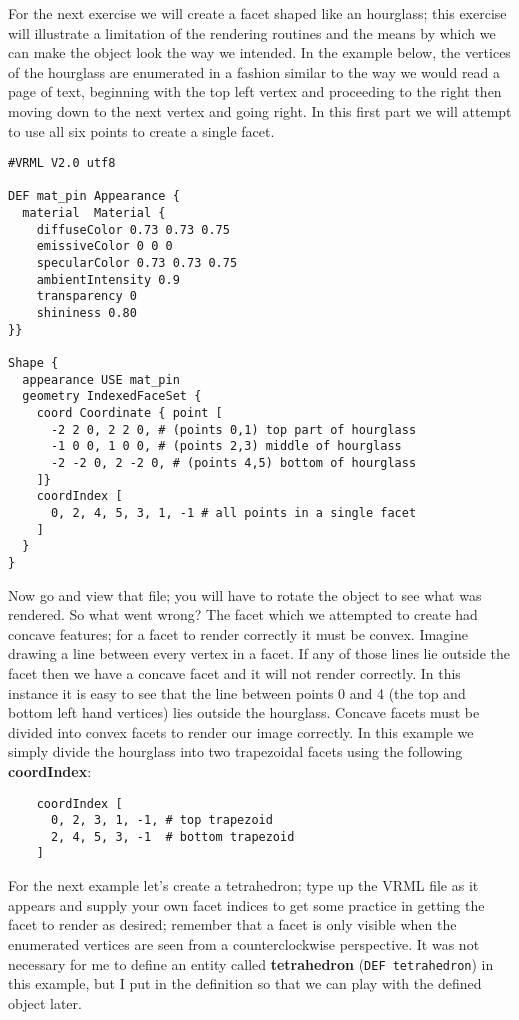 \documentclass[a4paper]{article}
\begin{document}
For the next exercise we will create a facet shaped like an hourglass; this exercise will illustrate a limitation of the rendering
routines and the means by which we can make the object look the way we intended. In the example below, the vertices of the hourglass
are enumerated in a fashion similar to the way we would read a page of text, beginning with the top left vertex and proceeding to the
right then moving down to the next vertex and going right. In this first part we will attempt to use all six points to create a single
facet.

\begin{verbatim}
#VRML V2.0 utf8

DEF mat_pin Appearance {
  material  Material {
    diffuseColor 0.73 0.73 0.75
    emissiveColor 0 0 0
    specularColor 0.73 0.73 0.75
    ambientIntensity 0.9
    transparency 0
    shininess 0.80
}}

Shape {
  appearance USE mat_pin
  geometry IndexedFaceSet {
    coord Coordinate { point [
      -2 2 0, 2 2 0, # (points 0,1) top part of hourglass
      -1 0 0, 1 0 0, # (points 2,3) middle of hourglass
      -2 -2 0, 2 -2 0, # (points 4,5) bottom of hourglass
    ]}
    coordIndex [
      0, 2, 4, 5, 3, 1, -1 # all points in a single facet
    ]
  }
}
\end{verbatim}

Now go and view that file; you will have to rotate the object to see what was rendered.  So what went wrong?
The facet which we attempted to create had concave features; for a facet to render correctly it must be convex.
Imagine drawing a line between every vertex in a facet. If any of those lines lie outside the facet then we
have a concave facet and it will not render correctly. In this instance it is easy to see that the line between
points 0 and 4 (the top and bottom left hand vertices) lies outside the hourglass. Concave facets must be
divided into convex facets to render our image correctly. In this example we simply divide the hourglass into
two trapezoidal facets using the following \textbf{coordIndex}:

\begin{verbatim}
    coordIndex [
      0, 2, 3, 1, -1, # top trapezoid
      2, 4, 5, 3, -1  # bottom trapezoid
    ]
\end{verbatim}

For the next example let's create a tetrahedron; type up the VRML file as it appears and supply your own facet
indices to get some practice in getting the facet to render as desired; remember that a facet is only visible
when the enumerated vertices are seen from a counterclockwise perspective. It was not necessary for me to
define an entity called \textbf{tetrahedron} (\verb~DEF tetrahedron~) in this example, but I put in the definition
so that we can play with the defined object later.
\end{document}
